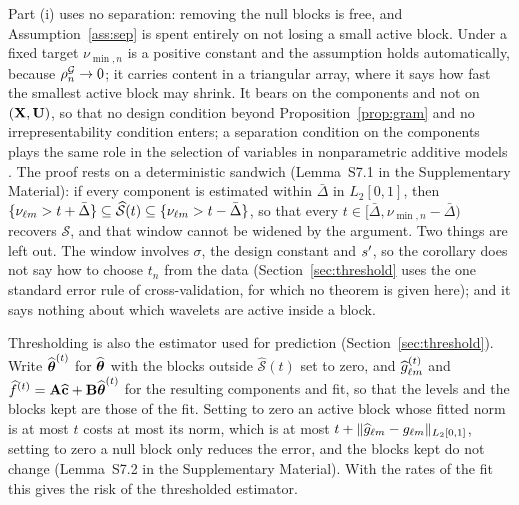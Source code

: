 Part (i) uses no separation: removing the null blocks is free, and
Assumption~\ref{ass:sep} is spent entirely on not losing a small active block.
Under a fixed target $\nu_{\min,n}$ is a positive constant and the assumption holds
automatically, because  $\rho^{\mathcal{G}}_{n} \to 0$; it carries content in a triangular
array, where it says how fast the smallest active block may shrink. It bears
on the components and not on $(\mathbf{X},\mathbf{U})$, so that no design condition beyond
Proposition~\ref{prop:gram} and no irrepresentability condition enters; a
separation condition on the components plays the same role in the selection
of variables in nonparametric additive models \citep{Huang-Horowitz-Wei-2010}.
The proof rests on a deterministic sandwich (Lemma~S7.1 in the Supplementary
Material): if every component is estimated within $\bar{\Delta}$ in $L_2[0,1]$, then
$\{\nu_{\ell m} > t + \bar{\Delta}\} \subseteq \widehat{\mathcal{S}}(t) \subseteq
\{\nu_{\ell m} > t - \bar{\Delta}\}$, so that every $t \in [\bar{\Delta}, \nu_{\min,n} - \bar{\Delta})$ recovers $\mathcal{S}$,
and that window cannot be widened by the argument. Two things are left out.
The window involves $\sigma$, the design constant and $s'$, so the
corollary does not say how to choose $t_n$ from the data (Section~\ref{sec:threshold}
uses the one standard error rule of cross-validation, for which no theorem is
given here); and it says nothing
about which wavelets are active inside a block.

Thresholding is also the estimator used for prediction
(Section~\ref{sec:threshold}). Write $\widehat{\boldsymbol{\theta}}^{(t)}$ for $\widehat{\boldsymbol{\theta}}$ with the
blocks outside $\widehat{\mathcal{S}}(t)$ set to zero, and
$\widehat{g}^{(t)}_{\ell m}$ and $\widehat{f}^{(t)} = \mathbf{A}\widehat{\mathbf{c}} +
\mathbf{B}\widehat{\boldsymbol{\theta}}^{(t)}$ for the resulting components and fit, so that the levels
and the blocks kept are those of the fit. Setting to zero an active block
whose fitted norm is at most $t$ costs at most its norm, which is at most
$t + \lVert\widehat{g}_{\ell m} - g_{\ell m}\rVert_{L_2[0,1]}$, setting to
zero a null block only reduces the error, and the blocks kept do not change
(Lemma~S7.2 in the Supplementary Material). With the rates of the fit this
gives the risk of the thresholded estimator.

